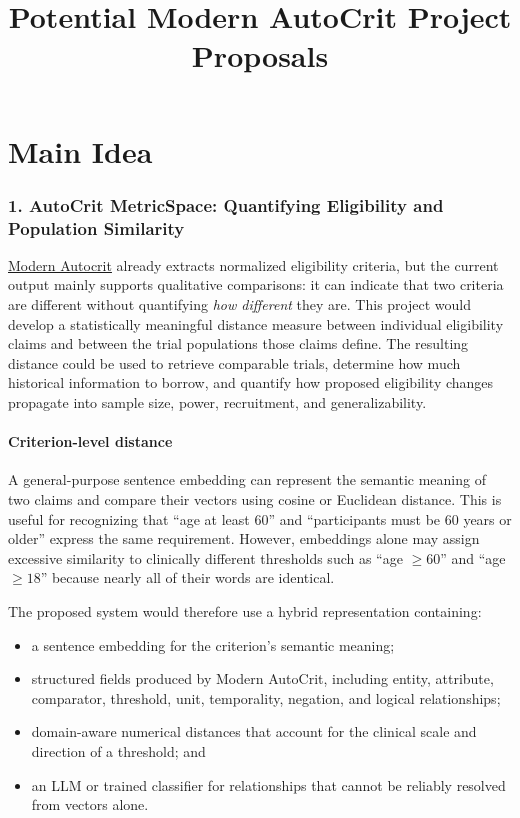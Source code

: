 \documentclass[11pt]{article}
\title{Potential Modern AutoCrit Project Proposals}
\author{}
\date{}
\begin{document}
\maketitle
\tableofcontents

\newpage
\part{Main Idea}
\section{1. AutoCrit MetricSpace: Quantifying Eligibility and Population Similarity}

\href{https://github.com/JonathanMa03/modern-autocrit}{Modern Autocrit} already extracts normalized eligibility criteria, but the current output mainly supports qualitative comparisons: it can indicate that two criteria are different without quantifying \emph{how different} they are. This project would develop a statistically meaningful distance measure between individual eligibility claims and between the trial populations those claims define. The resulting distance could be used to retrieve comparable trials, determine how much historical information to borrow, and quantify how proposed eligibility changes propagate into sample size, power, recruitment, and generalizability.

\subsection*{Criterion-level distance}

A general-purpose sentence embedding can represent the semantic meaning of two claims and compare their vectors using cosine or Euclidean distance. This is useful for recognizing that ``age at least 60'' and ``participants must be 60 years or older'' express the same requirement. However, embeddings alone may assign excessive similarity to clinically different thresholds such as ``age $\geq 60$'' and ``age $\geq 18$'' because nearly all of their words are identical.

The proposed system would therefore use a hybrid representation containing:

\begin{itemize}
    \item a sentence embedding for the criterion's semantic meaning;
    \item structured fields produced by Modern AutoCrit, including entity, attribute, comparator, threshold, unit, temporality, negation, and logical relationships;
    \item domain-aware numerical distances that account for the clinical scale and direction of a threshold; and
    \item an LLM or trained classifier for relationships that cannot be reliably resolved from vectors alone.
\end{itemize}
\end{document}
